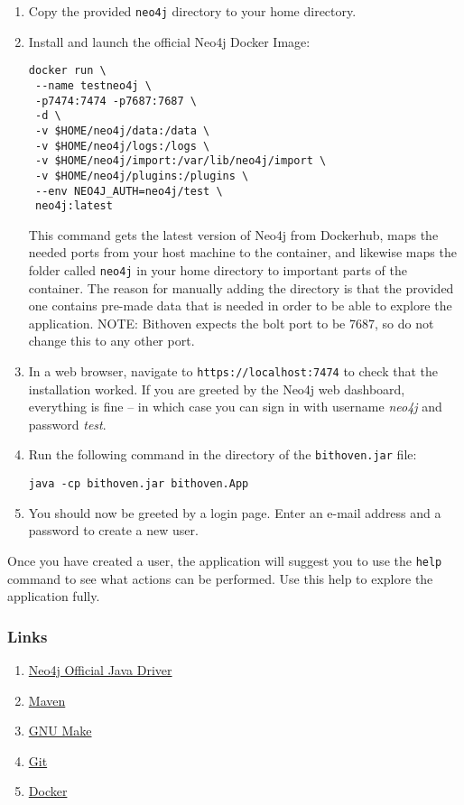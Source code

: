 \begin{enumerate}
    \item Copy the provided \texttt{neo4j} directory to your home directory.

    \item Install and launch the official Neo4j Docker Image:
\begin{verbatim}
docker run \
 --name testneo4j \
 -p7474:7474 -p7687:7687 \
 -d \
 -v $HOME/neo4j/data:/data \
 -v $HOME/neo4j/logs:/logs \
 -v $HOME/neo4j/import:/var/lib/neo4j/import \
 -v $HOME/neo4j/plugins:/plugins \
 --env NEO4J_AUTH=neo4j/test \
 neo4j:latest
\end{verbatim}
This command gets the latest version of Neo4j from Dockerhub, maps the needed
ports from your host machine to the container, and likewise maps the folder called
\texttt{neo4j} in your home directory to important parts of the container. The
reason for manually adding the directory is that the provided one contains
pre-made data that is needed in order to be able to explore the application.
NOTE:
Bithoven expects the bolt port to be 7687, so do not change this to any other
port.

    \item In a web browser, navigate to \texttt{https://localhost:7474} to check
        that the installation worked. If you are greeted by the Neo4j web
        dashboard, everything is fine -- in which case you can sign in with
        username \emph{neo4j} and password \emph{test}.

    \item Run the following command in the directory of the
        \texttt{bithoven.jar} file:
\begin{verbatim}
java -cp bithoven.jar bithoven.App
\end{verbatim}

    \item You should now be greeted by a login page. Enter an e-mail address and
        a password to create a new user.
\end{enumerate}

Once you have created a user, the application will suggest you to use the
\texttt{help} command to see what actions can be performed. Use this help to
explore the application fully.

\subsubsection{Links}
\label{installation-instructions-links}
\begin{enumerate}
    \item \href{https://neo4j.com/developer/java/}{Neo4j Official Java Driver}
    \item \href{https://maven.apache.org/download.cgi}{Maven}
    \item \href{https://gnu.org/software/make/}{GNU Make}
    \item \href{https://git-scm.com/}{Git}
    \item \href{https://docker.com}{Docker}
\end{enumerate}
